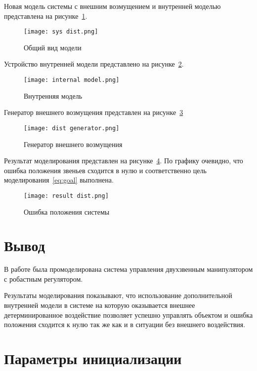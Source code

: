 \documentclass[14pt]{extarticle}
\begin{document}
    Новая модель системы с внешним возмущением и внутренней моделью представлена на рисунке~\ref{pic:sys dist}.
    \begin{figure}[H]
        \centering
        \texttt{[image: sys dist.png]}
        \caption{Общий вид модели}
        \label{pic:sys dist}
    \end{figure}

    Устройство внутренней модели представлено на рисунке~\ref{pic:internal model}.
    \begin{figure}[H]
        \centering
        \texttt{[image: internal model.png]}
        \caption{Внутренняя модель}
        \label{pic:internal model}
    \end{figure}

    Генератор внешнего возмущения представлен на рисунке~\ref{pic:dist generator}
    \begin{figure}[H]
        \centering
        \texttt{[image: dist generator.png]}
        \caption{Генератор внешнего возмущения}
        \label{pic:dist generator}
    \end{figure}

    Результат моделирования представлен на рисунке~\ref{pic:result dist}. По графику очевидно, что ошибка
    положения звеньев сходится в нулю и соответственно цель моделирования~\eqref{eq:goal} выполнена.
    \begin{figure}[H]
        \centering
        \texttt{[image: result dist.png]}
        \caption{Ошибка положения системы}
        \label{pic:result dist}
    \end{figure}

    \section*{Вывод}
    В работе была промоделирована система управления двухзвенным манипулятором с робастным регулятором.

    Результаты моделирования показывают, что использование дополнительной внутренней модели в системе
    на которую оказывается внешнее детерминированное воздействие позволяет успешно управлять объектом
    и ошибка положения сходится к нулю так же как и в ситуации без внешнего воздействия.

    \appendix \newpage
    \renewcommand{\thesection}{Приложение \Asbuk{section}}
    \section{Параметры инициализации}\label{code:given}
\end{document}
